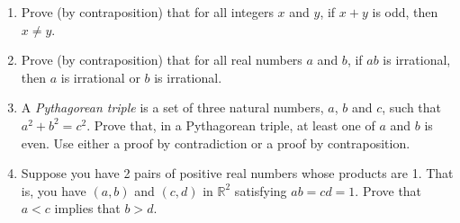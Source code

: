 \documentclass[10pt,]{book}
\theoremstyle{plain}
\theoremstyle{definition}
\theoremstyle{definition}
\numberwithin{equation}{section}
\newcommand{\hint}[1]{ }
\newcommand{\Integers}{{\mathbb Z}}
\newcommand{\Rationals}{{\mathbb Q}}
\newcommand{\Reals}{{\mathbb R}}
\newcommand{\lt}{ < }
\begin{document}
\begin{enumerate}[label=(\alph*)]
          \hint{Suppose that x is rational and y is irrational and their sum (let's call it z) is also rational. Do some algebra to solve for y, and you will see that y (which is, by presumption, irrational) is also the difference of two rational numbers (and hence, rational \textemdash{} a contradiction.)
          }
\item\hypertarget{li-258}{}
          Prove (by contraposition) that for all integers \(x\) and \(y\), if \(x+y\) is odd, then \(x\neq y\).

          \hint{Well, the problem says to do this by contraposition, so let's write down the contrapositive:
          \begin{equation*}
            \forall x, y \in \Integers, \; x=y \, \implies \, x+y \; \mbox{is even} .
          \end{equation*}
          But proving that is obvious!
          }
\item\hypertarget{li-259}{}
          Prove (by contraposition) that for all real numbers \(a\) and \(b\), if \(ab\) is irrational, then \(a\)
          is irrational or \(b\) is irrational.

          \hint{The contrapositive would be:
          \begin{equation*}
            \forall a,b \in \Reals, \; (a \in \Rationals \land b \in \Rationals) \, \implies ab \in \Rationals.
          \end{equation*}
          Wow! Haven't we proved that before?}
\item\hypertarget{li-260}{}
          A \emph{Pythagorean triple} is a set of three
          natural numbers, \(a\), \(b\) and \(c\), such that \(a^2 + b^2 = c^2\).  Prove that, in a
          Pythagorean triple, at least one of \(a\) and \(b\) is even.  Use either a proof by
          contradiction or a proof by contraposition.

          \hint{If both \(a\) and \(b\) are odd then their squares will be 1 mod 4 \textemdash{} so the sum of their squares
          will be 2 mod 4.  But \(c^2\) can only be 0 or 1 mod 4, which gives us a contradiction.}
\item\hypertarget{li-261}{}
        Suppose you have 2 pairs of positive real numbers whose products are 1.  That is, you have \((a,b)\) and \((c,d)\) in \(\Reals^2\) satisfying \(ab=cd=1\).  Prove that
        \(a \lt  c\) implies that \(b > d\).

         \hint{

        \begin{proof}\hypertarget{proof-16}{}

            Suppose by way of contradiction that \(a,b,c,d \in \Reals\) satisfy \(ab=cd=1\) and that \(a\lt c\) and \(b \leq d\).
            By multiplying the inequalities we get that \(ab \lt  cd\) which contradicts the assumption that both products
            are equal to 1 (and so must be equal to one another).
\end{proof}


        }
\end{enumerate}
\end{document}
